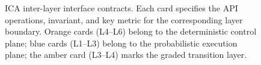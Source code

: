 \begin{figure}[htbp]
\caption{ICA inter-layer interface contracts.
Each card specifies the API operations, invariant, and key metric for the
corresponding layer boundary.
Orange cards (L4--L6) belong to the deterministic control plane;
blue cards (L1--L3) belong to the probabilistic execution plane;
the amber card (L3--L4) marks the graded transition layer.}
\label{fig:interface_contracts}
\end{figure}
